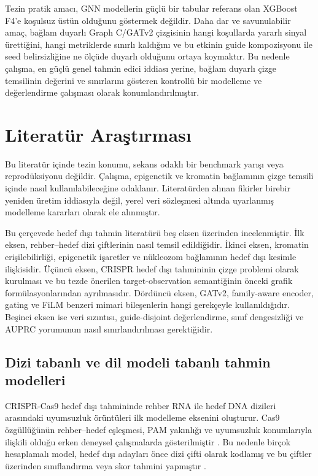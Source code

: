 Tezin pratik amacı, GNN modellerin güçlü bir tabular referans olan XGBoost F4'e koşulsuz üstün olduğunu göstermek değildir. Daha dar ve savunulabilir amaç, bağlam duyarlı Graph C/GATv2 çizgisinin hangi koşullarda yararlı sinyal ürettiğini, hangi metriklerde sınırlı kaldığını ve bu etkinin guide kompozisyonu ile seed belirsizliğine ne ölçüde duyarlı olduğunu ortaya koymaktır. Bu nedenle çalışma, en güçlü genel tahmin edici iddiası yerine, bağlam duyarlı çizge temsilinin değerini ve sınırlarını gösteren kontrollü bir modelleme ve değerlendirme çalışması olarak konumlandırılmıştır.

\section{Literatür Araştırması}

Bu literatür içinde tezin konumu, sekans odaklı bir benchmark yarışı veya  reprodüksiyonu değildir. Çalışma, epigenetik ve kromatin bağlamının çizge temsili içinde nasıl kullanılabileceğine odaklanır. Literatürden alınan fikirler birebir yeniden üretim iddiasıyla değil, yerel veri sözleşmesi altında uyarlanmış modelleme kararları olarak ele alınmıştır.

Bu çerçevede hedef dışı tahmin literatürü beş eksen üzerinden incelenmiştir. İlk eksen, rehber--hedef dizi çiftlerinin nasıl temsil edildiğidir. İkinci eksen, kromatin erişilebilirliği, epigenetik işaretler ve nükleozom bağlamının hedef dışı kesimle ilişkisidir. Üçüncü eksen, CRISPR hedef dışı tahmininin çizge problemi olarak kurulması ve bu tezde önerilen target-observation semantiğinin önceki grafik formülasyonlarından ayrılmasıdır. Dördüncü eksen, GATv2, family-aware encoder, gating ve FiLM benzeri mimari bileşenlerin hangi gerekçeyle kullanıldığıdır. Beşinci eksen ise veri sızıntısı, guide-disjoint değerlendirme, sınıf dengesizliği ve AUPRC yorumunun nasıl sınırlandırılması gerektiğidir.

\subsection{Dizi tabanlı ve dil modeli tabanlı tahmin modelleri}

CRISPR-Cas9 hedef dışı tahmininde rehber RNA ile hedef DNA dizileri arasındaki uyumsuzluk örüntüleri ilk modelleme eksenini oluşturur. Cas9 özgüllüğünün rehber--hedef eşleşmesi, PAM yakınlığı ve uyumsuzluk konumlarıyla ilişkili olduğu erken deneysel çalışmalarda gösterilmiştir . Bu nedenle birçok hesaplamalı model, hedef dışı adayları önce dizi çifti olarak kodlamış ve bu çiftler üzerinden sınıflandırma veya skor tahmini yapmıştır .

